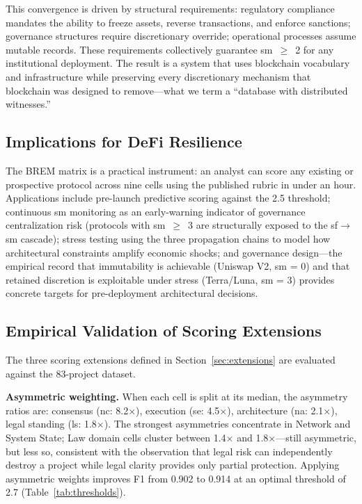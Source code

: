 \documentclass[conference]{IEEEtran}
\begin{document}
This convergence is driven by structural requirements: regulatory compliance mandates the ability to freeze assets, reverse transactions, and enforce sanctions; governance structures require discretionary override; operational processes assume mutable records. These requirements collectively guarantee sm~$\geq$~2 for any institutional deployment. The result is a system that uses blockchain vocabulary and infrastructure while preserving every discretionary mechanism that blockchain was designed to remove---what we term a ``database with distributed witnesses.''

\subsection{Implications for DeFi Resilience}

The BREM matrix is a practical instrument: an analyst can score any existing or prospective protocol across nine cells using the published rubric in under an hour. Applications include pre-launch predictive scoring against the 2.5 threshold; continuous sm monitoring as an early-warning indicator of governance centralization risk (protocols with sm~$\geq$~3 are structurally exposed to the sf$\rightarrow$sm cascade); stress testing using the three propagation chains to model how architectural constraints amplify economic shocks; and governance design---the empirical record that immutability is achievable (Uniswap V2, sm = 0) and that retained discretion is exploitable under stress (Terra/Luna, sm = 3) provides concrete targets for pre-deployment architectural decisions.

\subsection{Empirical Validation of Scoring Extensions}\label{sec:ext-empirical}

The three scoring extensions defined in Section~\ref{sec:extensions} are evaluated against the 83-project dataset.

\textbf{Asymmetric weighting.} When each cell is split at its median, the asymmetry ratios are: consensus (nc: 8.2$\times$), execution (se: 4.5$\times$), architecture (na: 2.1$\times$), legal standing (ls: 1.8$\times$). The strongest asymmetries concentrate in Network and System State; Law domain cells cluster between 1.4$\times$ and 1.8$\times$---still asymmetric, but less so, consistent with the observation that legal risk can independently destroy a project while legal clarity provides only partial protection. Applying asymmetric weights improves F1 from 0.902 to 0.914 at an optimal threshold of 2.7 (Table~\ref{tab:thresholds}).
\end{document}
